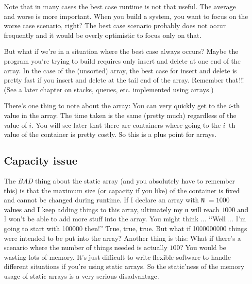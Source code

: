 Note that in many cases the best case runtime is not that useful.
The average and worse is more important.
When you build a system, you want to focus on the worse case
scenario, right?
The best case scenario probably does not occur frequently
and it would be overly optimistic to focus only on that.

But what if we're in a situation where the best case always occurs?
Maybe the program you're trying to build requires only insert
and delete at one end of the array.
In the case of the (unsorted) array, the best case for insert and delete
is pretty fast if you insert and delete at the tail end
of the array.
Remember that!!!
(See a later chapter on stacks, queues, etc. implemented using arrays.)

There's one thing to note about the array:
You can very quickly get to the $i$-th value in the array.
The time taken is the same (pretty much) regardless of the value of $i$.
You will see later that there are containers where going to the 
$i$--th value of the container is pretty costly.
So this is a plus point for arrays.



\newpage
\subsection{Capacity issue}

The \textit{BAD} thing about the static array (and you absolutely have to 
remember this) is that the maximum size 
(or capacity if you like) of the container is fixed
and cannot be changed during runtime.
If I declare an array with \verb!N! $= 1000$ values
and I keep adding things to this array, ultimately
my \verb!n! will reach $1000$ and I won't be able to 
add more stuff into the array.
You might think ... \lq\lq Well ... I'm going to start with 100000
then!''
True, true, true.
But what if 1000000000 things were intended to be put into the array?
Another thing is this:
What if there's a scenario where the number of things needed
is actually $100$?
You would be wasting lots of memory.
It's just difficult to write flexible software to handle different situations
if you're using static arrays.
So the static'ness of the memory usage of static arrays is a very
serious disadvantage.


